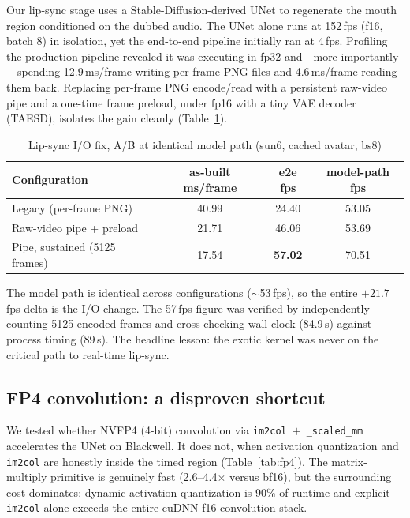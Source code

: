 \documentclass[11pt,a4paper]{article}
\begin{document}
Our lip-sync stage uses a Stable-Diffusion-derived UNet to regenerate the mouth region conditioned on the dubbed audio. The UNet alone runs at 152\,fps (f16, batch 8) in isolation, yet the end-to-end pipeline initially ran at 4\,fps. Profiling the production pipeline revealed it was executing in fp32 and---more importantly---spending 12.9\,ms/frame writing per-frame PNG files and 4.6\,ms/frame reading them back. Replacing per-frame PNG encode/read with a persistent raw-video pipe and a one-time frame preload, under fp16 with a tiny VAE decoder (TAESD), isolates the gain cleanly (Table~\ref{tab:io}).

\begin{table}[H]
\centering
\caption{Lip-sync I/O fix, A/B at identical model path (sun6, cached avatar, bs8)}
\label{tab:io}
\begin{tabular}{lccc}
\toprule
Configuration & as-built ms/frame & e2e fps & model-path fps \\
\midrule
Legacy (per-frame PNG) & 40.99 & 24.40 & 53.05 \\
Raw-video pipe + preload & 21.71 & 46.06 & 53.69 \\
Pipe, sustained (5125 frames) & 17.54 & \textbf{57.02} & 70.51 \\
\bottomrule
\end{tabular}
\end{table}

The model path is identical across configurations ($\sim$53\,fps), so the entire $+21.7$\,fps delta is the I/O change. The 57\,fps figure was verified by independently counting 5125 encoded frames and cross-checking wall-clock (84.9\,s) against process timing (89\,s). The headline lesson: the exotic kernel was never on the critical path to real-time lip-sync.

\subsection{FP4 convolution: a disproven shortcut}

We tested whether NVFP4 (4-bit) convolution via \texttt{im2col}~$+$~\texttt{\_scaled\_mm} accelerates the UNet on Blackwell. It does not, when activation quantization and \texttt{im2col} are honestly inside the timed region (Table~\ref{tab:fp4}). The matrix-multiply primitive is genuinely fast (2.6--4.4$\times$ versus bf16), but the surrounding cost dominates: dynamic activation quantization is 90\% of runtime and explicit \texttt{im2col} alone exceeds the entire cuDNN f16 convolution stack.
\end{document}
